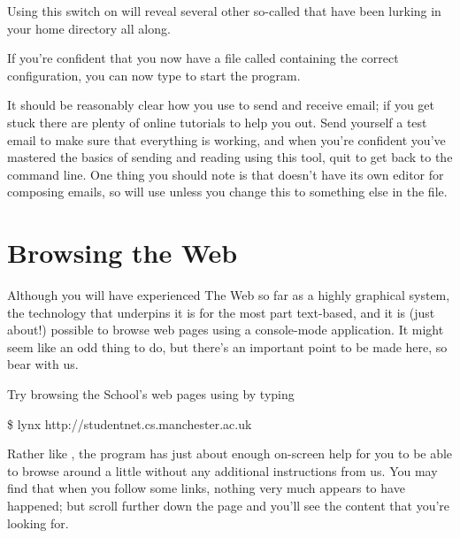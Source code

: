 Using this switch on  will reveal several other so-called  that have been lurking in your home directory all along.

If you're confident that you now have a file called  containing the correct configuration, you can now type  to start the program. 

It should be reasonably clear how you use  to send and receive email; if you get stuck there are plenty of online tutorials to help you out. Send yourself a test email to make sure that everything is working, and when you're confident you've mastered the basics of sending and reading using this tool, quit  to get back to the command line. One thing you should note is that  doesn't have its own editor for composing emails, so will use  unless you change this to something else in the  file. 

\section{Browsing the Web}

Although you will have experienced The Web so far as a highly graphical system, the technology that underpins it is for the most part text-based, and it is (just about!) possible to browse web pages using a console-mode application. It might seem like an odd thing to do, but there's an important point to be made here, so bear with us.



Try browsing the School's web pages using  by typing

\begin{ttoutenv}
\$ lynx http://studentnet.cs.manchester.ac.uk
\end{ttoutenv}

Rather like , the  program has just about enough on-screen help for you to be able to browse around a little without any additional instructions from us.  You may find that when you follow some links, nothing very much appears to have happened; but scroll further down the page and you'll see the content that you're looking for.

